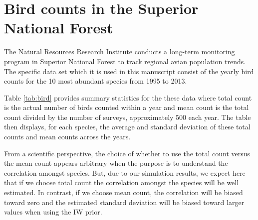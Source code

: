 \documentclass[12pt]{article}
\newcommand{\matt}[1]{\textcolor{red}{(matt: #1)}}
\begin{document}
\section{Bird counts in the Superior National Forest \label{sec:birds}}

The Natural Resources Research Institute conducts a long-term monitoring program in Superior National Forest to track regional avian population trends. The specific data set which it is used in this manuscript consist of the yearly bird counts for the 10 most abundant species from 1995 to 2013. 

Table \ref{tab:bird} provides summary statistics for the these data where total count is the actual number of birds counted within a year and mean count is the total count divided by the number of surveys, approximately 500 each year. The table then displays, for each species, the average and standard deviation of these total counts and mean counts across the years.



From a scientific perspective, the choice of whether to use the total count versus the mean count appears arbitrary when the purpose is to understand the correlation amongst species. But, due to our simulation results, we expect here that if we choose total count the correlation amongst the species will be well estimated. In contrast, if we choose mean count, the correlation will be biased toward zero and the estimated standard deviation will be biased toward larger values when using the IW prior. 
\end{document}
